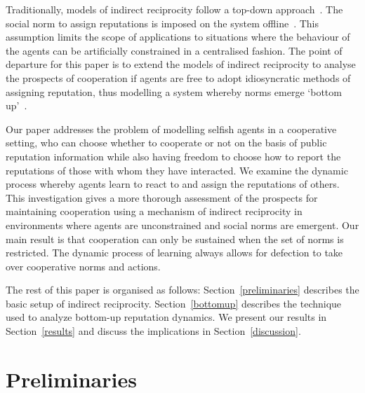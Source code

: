\documentclass[sigconf]{aamas}  %
\begin{document}
Traditionally, models of indirect reciprocity follow a top-down approach~\cite{villatoro2010social}. The social norm to assign reputations is imposed on the system offline~\cite{shoham1995social}.  This assumption limits the scope of applications to situations where the behaviour of the agents can be artificially constrained in a centralised fashion. The point of departure for this paper is to extend the models of indirect reciprocity to analyse the prospects of cooperation if agents are free to adopt idiosyncratic methods of assigning reputation, thus modelling a system whereby norms emerge `bottom up'~\cite{shoham1997emergence}. %

 Our paper addresses the problem of modelling selfish agents in a cooperative setting, who can choose whether to cooperate or not on the basis of public reputation information while also having freedom to choose how to report the reputations of those with whom they have interacted. We examine the dynamic process whereby agents learn to react to and assign the reputations of others. This investigation gives a more thorough assessment of the prospects for maintaining cooperation using a mechanism of indirect reciprocity in environments where agents are unconstrained and social norms are emergent. Our main result is that cooperation can only be sustained when the set of norms is restricted. The dynamic process of learning always allows for defection to take over cooperative norms and actions.
 
    
The rest of this paper is organised as follows: Section~\ref{preliminaries} describes the basic setup of indirect reciprocity. Section~\ref{bottomup} describes the technique used to analyze bottom-up reputation dynamics. We present our results in  Section~\ref{results} and discuss the implications in Section~\ref{discussion}.

\section{Preliminaries \label{preliminaries}}
\end{document}
